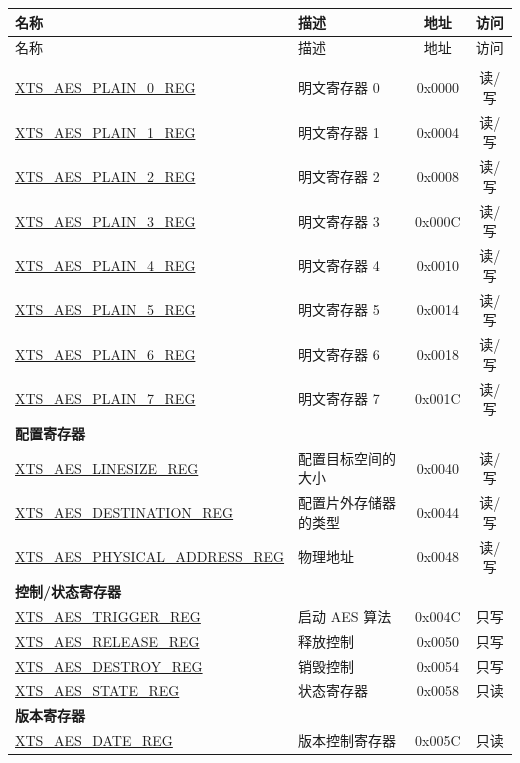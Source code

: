 

\begin{longtable}{ | p{6.0cm} | p{6.6cm} | c | c| }
\hline\rowcolor{lightgray}
名称 & 描述 & 地址 & 访问 \\ \hline
\endfirsthead
\hline
\rowcolor{lightgray}
名称 & 描述 & 地址 & 访问  \\
\hline
\endhead
\endfoot
        
\multicolumn{4}{|l|}{\textbf{明文寄存器堆}} \\\hline
\hyperref[regdesc:XTSAESPLAINNREG]{XTS\_AES\_PLAIN\_0\_REG}  & 明文寄存器 0   & 0x0000 & 读/写 \\\hline
\hyperref[regdesc:XTSAESPLAINNREG]{XTS\_AES\_PLAIN\_1\_REG}  & 明文寄存器 1   & 0x0004 & 读/写 \\\hline
\hyperref[regdesc:XTSAESPLAINNREG]{XTS\_AES\_PLAIN\_2\_REG}  & 明文寄存器 2   & 0x0008 & 读/写 \\\hline
\hyperref[regdesc:XTSAESPLAINNREG]{XTS\_AES\_PLAIN\_3\_REG}  & 明文寄存器 3   & 0x000C & 读/写 \\\hline
\hyperref[regdesc:XTSAESPLAINNREG]{XTS\_AES\_PLAIN\_4\_REG}  & 明文寄存器 4   & 0x0010 & 读/写 \\\hline
\hyperref[regdesc:XTSAESPLAINNREG]{XTS\_AES\_PLAIN\_5\_REG}  & 明文寄存器 5   & 0x0014 & 读/写 \\\hline
\hyperref[regdesc:XTSAESPLAINNREG]{XTS\_AES\_PLAIN\_6\_REG}  & 明文寄存器 6   & 0x0018 & 读/写 \\\hline
\hyperref[regdesc:XTSAESPLAINNREG]{XTS\_AES\_PLAIN\_7\_REG}  & 明文寄存器 7   & 0x001C & 读/写 \\\hline
\multicolumn{4}{|l|}{\textbf{配置寄存器}} \\ \hline
\hyperref[regdesc:XTSAESLINESIZEREG]       {XTS\_AES\_LINESIZE\_REG         }  & 配置目标空间的大小 & 0x0040 & 读/写 \\\hline
\hyperref[regdesc:XTSAESDESTINATIONREG]    {XTS\_AES\_DESTINATION\_REG      }  & 配置片外存储器的类型   & 0x0044 & 读/写 \\\hline
\hyperref[regdesc:XTSAESPHYSICALADDRESSREG]{XTS\_AES\_PHYSICAL\_ADDRESS\_REG}  & 物理地址   & 0x0048 & 读/写 \\\hline
\multicolumn{4}{|l|}{\textbf{控制/状态寄存器}} \\ \hline
\hyperref[regdesc:XTSAESTRIGGERREG]        {XTS\_AES\_TRIGGER\_REG          }  & 启动 AES 算法         & 0x004C & 只写 \\\hline
\hyperref[regdesc:XTSAESRELEASEREG]        {XTS\_AES\_RELEASE\_REG          }  & 释放控制         & 0x0050 & 只写 \\\hline
\hyperref[regdesc:XTSAESDESTROYREG]        {XTS\_AES\_DESTROY\_REG          }  & 销毁控制         & 0x0054 & 只写 \\\hline
\hyperref[regdesc:XTSAESSTATEREG]          {XTS\_AES\_STATE\_REG            }  & 状态寄存器       & 0x0058 & 只读 \\\hline
\multicolumn{4}{|l|}{\textbf{版本寄存器}} \\ \hline
\hyperref[regdesc:XTSAESDATEREG]           {XTS\_AES\_DATE\_REG             }  & 版本控制寄存器   & 0x005C & 只读 \\\hline

\end{longtable}
